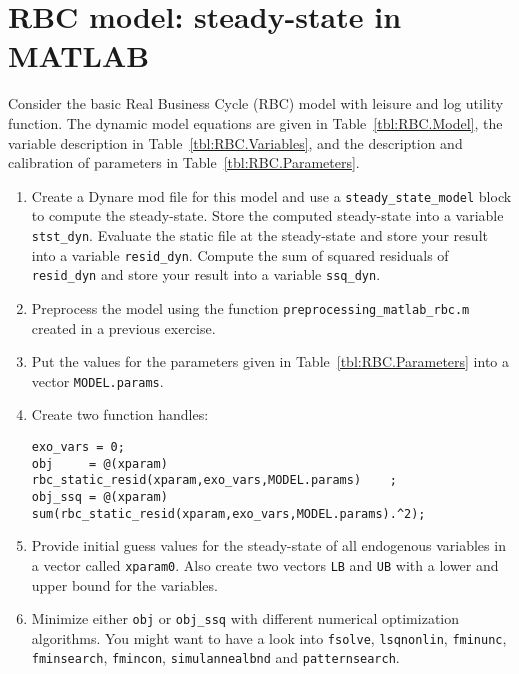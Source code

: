 \section[RBC model: steady-state in MATLAB]{RBC model: steady-state in MATLAB\label{ex:RBCModelSteadyMATLAB}}
Consider the basic Real Business Cycle (RBC) model with leisure and log utility function.
The dynamic model equations are given in Table~\ref{tbl:RBC.Model},
  the variable description in Table~\ref{tbl:RBC.Variables},
  and the description and calibration of parameters in Table~\ref{tbl:RBC.Parameters}.

\begin{enumerate}

\item
Create a Dynare mod file for this model and use a \texttt{steady\_state\_model} block to compute the steady-state.
Store the computed steady-state into a variable \texttt{stst\_dyn}.
Evaluate the static file at the steady-state and store your result into a variable \texttt{resid\_dyn}.
Compute the sum of squared residuals of \texttt{resid\_dyn} and store your result into a variable \texttt{ssq\_dyn}.

\item
Preprocess the model using the function \texttt{preprocessing\_matlab\_rbc.m} created in a previous exercise.

\item
Put the values for the parameters given in Table~\ref{tbl:RBC.Parameters} into a vector \texttt{MODEL.params}.

\item
Create two function handles:
\begin{lstlisting}[style=Matlab-editor,basicstyle=\mlttfamily\scriptsize]
exo_vars = 0;
obj     = @(xparam)     rbc_static_resid(xparam,exo_vars,MODEL.params)    ;
obj_ssq = @(xparam) sum(rbc_static_resid(xparam,exo_vars,MODEL.params).^2);
\end{lstlisting} 

\item
Provide initial guess values for the steady-state of all endogenous variables in a vector called \texttt{xparam0}.
Also create two vectors \texttt{LB} and \texttt{UB} with a lower and upper bound for the variables.

\item
Minimize either \texttt{obj} or \texttt{obj\_ssq} with different numerical optimization algorithms.
You might want to have a look into
\texttt{fsolve}, \texttt{lsqnonlin}, \texttt{fminunc}, \texttt{fminsearch}, \texttt{fmincon}, \texttt{simulannealbnd} and \texttt{patternsearch}.


\end{enumerate}
